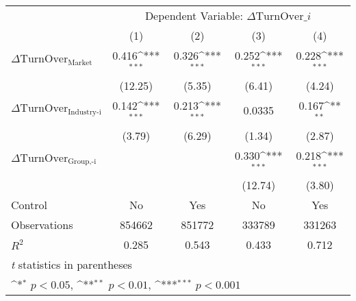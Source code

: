 {
\def\sym#1{\ifmmode^{#1}\else\(^{#1}\)\fi}
\begin{tabular}{l*{4}{c}}
\hline\hline
                    &\multicolumn{4}{c}{Dependent Variable: $\Delta \text{TurnOver}\_{i} $ }                 \\\cmidrule(lr){2-5}
                    &\multicolumn{1}{c}{(1)}         &\multicolumn{1}{c}{(2)}         &\multicolumn{1}{c}{(3)}         &\multicolumn{1}{c}{(4)}         \\
\hline
 $ \Delta \text{TurnOver}_{\text{Market}} $ &       0.416\sym{***}&       0.326\sym{***}&       0.252\sym{***}&       0.228\sym{***}\\
                    &     (12.25)         &      (5.35)         &      (6.41)         &      (4.24)         \\
[1em]
 $ \Delta \text{TurnOver}_{\text{Industry-i}} $ &       0.142\sym{***}&       0.213\sym{***}&      0.0335         &       0.167\sym{**} \\
                    &      (3.79)         &      (6.29)         &      (1.34)         &      (2.87)         \\
[1em]
 $ \Delta \text{TurnOver}_{\text{Group,-i}} $ &                     &                     &       0.330\sym{***}&       0.218\sym{***}\\
                    &                     &                     &     (12.74)         &      (3.80)         \\
\hline
Control             &          No         &         Yes         &          No         &         Yes         \\
Observations        &      854662         &      851772         &      333789         &      331263         \\
$ R^2 $             &       0.285         &       0.543         &       0.433         &       0.712         \\
\hline\hline
\multicolumn{5}{l}{\footnotesize \textit{t} statistics in parentheses}\\
\multicolumn{5}{l}{\footnotesize \sym{*} \(p<0.05\), \sym{**} \(p<0.01\), \sym{***} \(p<0.001\)}\\
\end{tabular}
}
